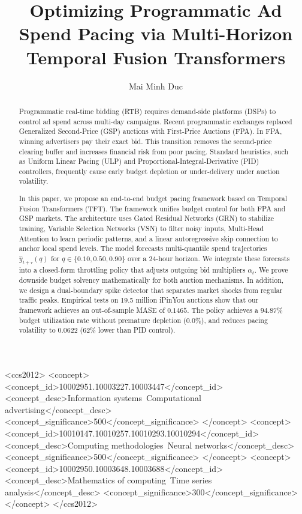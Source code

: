 \documentclass[sigconf]{acmart}
\begin{document}
\title{Optimizing Programmatic Ad Spend Pacing via Multi-Horizon Temporal Fusion Transformers}

\author{Mai Minh Duc}

\begin{abstract}
  Programmatic real-time bidding (RTB) requires demand-side platforms (DSPs) to control ad spend across multi-day campaigns. Recent programmatic exchanges replaced Generalized Second-Price (GSP) auctions with First-Price Auctions (FPA). In FPA, winning advertisers pay their exact bid. This transition removes the second-price clearing buffer and increases financial risk from poor pacing. Standard heuristics, such as Uniform Linear Pacing (ULP) and Proportional-Integral-Derivative (PID) controllers, frequently cause early budget depletion or under-delivery under auction volatility.

  In this paper, we propose an end-to-end budget pacing framework based on Temporal Fusion Transformers (TFT). The framework unifies budget control for both FPA and GSP markets. The architecture uses Gated Residual Networks (GRN) to stabilize training, Variable Selection Networks (VSN) to filter noisy inputs, Multi-Head Attention to learn periodic patterns, and a linear autoregressive skip connection to anchor local spend levels. The model forecasts multi-quantile spend trajectories $\hat{y}_{t+\tau}(q)$ for $q \in \{0.10, 0.50, 0.90\}$ over a 24-hour horizon. We integrate these forecasts into a closed-form throttling policy that adjusts outgoing bid multipliers $\alpha_t$. We prove downside budget solvency mathematically for both auction mechanisms. In addition, we design a dual-boundary spike detector that separates market shocks from regular traffic peaks. Empirical tests on 19.5 million iPinYou auctions show that our framework achieves an out-of-sample MASE of $0.1465$. The policy achieves a $94.87\%$ budget utilization rate without premature depletion ($0.0\%$), and reduces pacing volatility to $0.0622$ ($62\%$ lower than PID control).
\end{abstract}

\begin{CCSXML}
  <ccs2012>
  <concept>
  <concept_id>10002951.10003227.10003447</concept_id>
  <concept_desc>Information systems~Computational advertising</concept_desc>
  <concept_significance>500</concept_significance>
  </concept>
  <concept>
  <concept_id>10010147.10010257.10010293.10010294</concept_id>
  <concept_desc>Computing methodologies~Neural networks</concept_desc>
  <concept_significance>500</concept_significance>
  </concept>
  <concept>
  <concept_id>10002950.10003648.10003688</concept_id>
  <concept_desc>Mathematics of computing~Time series analysis</concept_desc>
  <concept_significance>300</concept_significance>
  </concept>
  </ccs2012>
\end{CCSXML}
\end{document}
